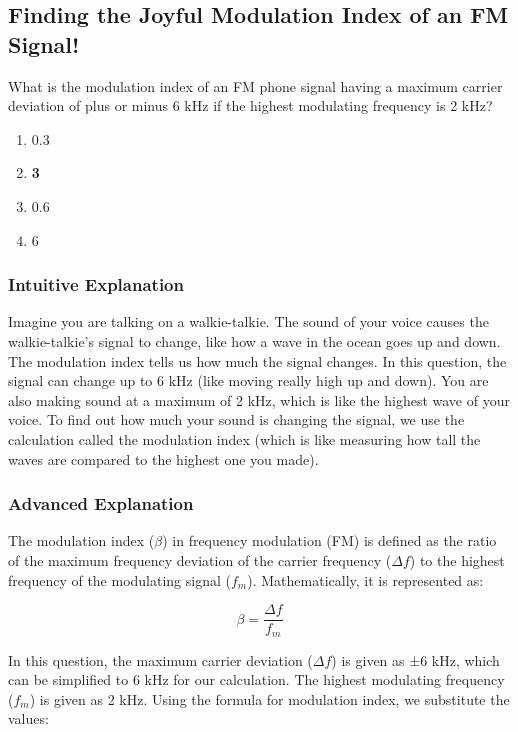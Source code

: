 \subsection{Finding the Joyful Modulation Index of an FM Signal!}

\begin{tcolorbox}[colback=gray!10, colframe=black!80, title={Question ID: E8B04}]
What is the modulation index of an FM phone signal having a maximum carrier deviation of plus or minus 6 kHz if the highest modulating frequency is 2 kHz?
\begin{enumerate}[label=\Alph*.]
    \item 0.3
    \item \textbf{3}
    \item 0.6
    \item 6
\end{enumerate}
\end{tcolorbox}

\subsubsection{Intuitive Explanation}
Imagine you are talking on a walkie-talkie. The sound of your voice causes the walkie-talkie's signal to change, like how a wave in the ocean goes up and down. The modulation index tells us how much the signal changes. In this question, the signal can change up to 6 kHz (like moving really high up and down). You are also making sound at a maximum of 2 kHz, which is like the highest wave of your voice. To find out how much your sound is changing the signal, we use the calculation called the modulation index (which is like measuring how tall the waves are compared to the highest one you made).

\subsubsection{Advanced Explanation}
The modulation index (\( \beta \)) in frequency modulation (FM) is defined as the ratio of the maximum frequency deviation of the carrier frequency (\( \Delta f \)) to the highest frequency of the modulating signal (\( f_m \)). Mathematically, it is represented as:

\[
\beta = \frac{\Delta f}{f_m}
\]

In this question, the maximum carrier deviation (\( \Delta f \)) is given as ±6 kHz, which can be simplified to 6 kHz for our calculation. The highest modulating frequency (\( f_m \)) is given as 2 kHz. Using the formula for modulation index, we substitute the values:

